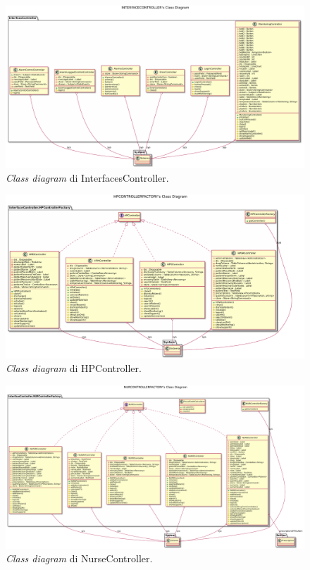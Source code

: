 \documentclass[final, smallexted]{svjour3}
\begin{document}
\begin{landscape}
	\begin{figure}
		\includegraphics[scale=.55]{ClassDiagramImages/InterfacesController.pdf}
		\caption{\textit{Class diagram} di InterfacesController.}\label{interfacescontrollerclassdiagram}
	\end{figure}
\end{landscape}

\begin{landscape}
	\begin{figure}
		\includegraphics[scale=.65]{ClassDiagramImages/HPController.pdf}
		\caption{\textit{Class diagram} di HPController.}\label{hpcontrollerclassdiagram}
	\end{figure}
\end{landscape}

\begin{landscape}
	\begin{figure}
		\includegraphics[scale=.50]{ClassDiagramImages/NurseController.pdf}
		\caption{\textit{Class diagram} di NurseController.}\label{nursecontrollerclassdiagram}
	\end{figure}
\end{landscape}
\end{document}
